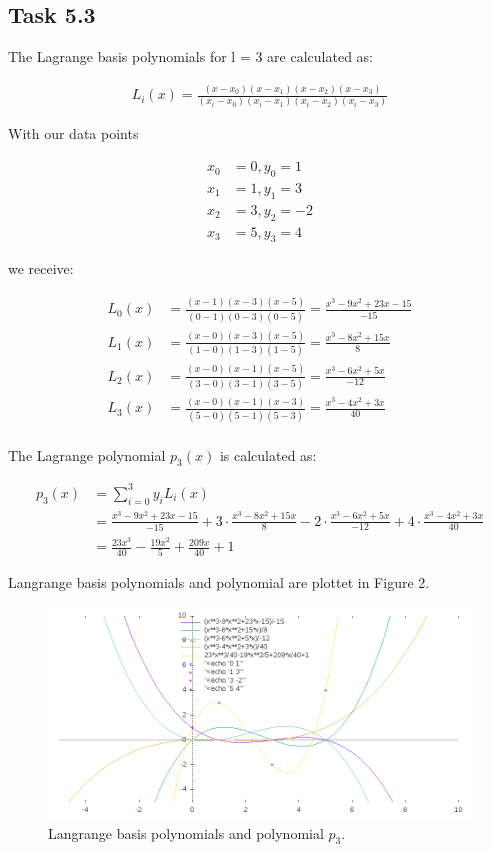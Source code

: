 \subsection*{Task 5.3}

The Lagrange basis polynomials for l = 3 are calculated as:

\begin{align*}
	L_i(x) = \frac{(x-x_0)(x-x_1)(x-x_2)(x-x_3)}{(x_i-x_0)(x_i-x_1)(x_i-x_2)(x_i-x_3)}
\end{align*}

With our data points

\begin{align*}
x_0 &= 0, y_0 = 1\\
x_1 &= 1, y_1 = 3\\
x_2 &= 3, y_2 = -2\\
x_3 &= 5, y_3 = 4\
\end{align*}

we receive:

\begin{align*}
L_0(x) &= \frac{(x-1)(x-3)(x-5)}{(0-1)(0-3)(0-5)}
 = \frac{x^3-9x^2+23x-15}{-15}\\
L_1(x) &= \frac{(x-0)(x-3)(x-5)}{(1-0)(1-3)(1-5)}
 = \frac{x^3-8x^2+15x}{8}\\
L_2(x) &= \frac{(x-0)(x-1)(x-5)}{(3-0)(3-1)(3-5)}
 = \frac{x^3-6x^2+5x}{-12}\\
L_3(x) &= \frac{(x-0)(x-1)(x-3)}{(5-0)(5-1)(5-3)}
 = \frac{x^3-4x^2+3x}{40}\\
\end{align*}

The Lagrange polynomial $p_3(x)$ is calculated as:

\begin{align*}
p_3(x) &= \sum_{i=0}^{3}y_iL_i(x) \\
&= \frac{x^3-9x^2+23x-15}{-15}+ 3\cdot \frac{x^3-8x^2+15x}{8} -2\cdot \frac{x^3-6x^2+5x}{-12}+ 4\cdot \frac{x^3-4x^2+3x}{40}\\
&= \frac{23x^3}{40}-\frac{19x^2}{5}+\frac{209x}{40}+1
\end{align*}

Langrange basis polynomials and polynomial are plottet in Figure 2.

\begin{figure}[!h]
	\centering
	\includegraphics[width= 1\textwidth ]{task52.png}
	\caption{Langrange basis polynomials and polynomial $p_3$.}
\end{figure}
